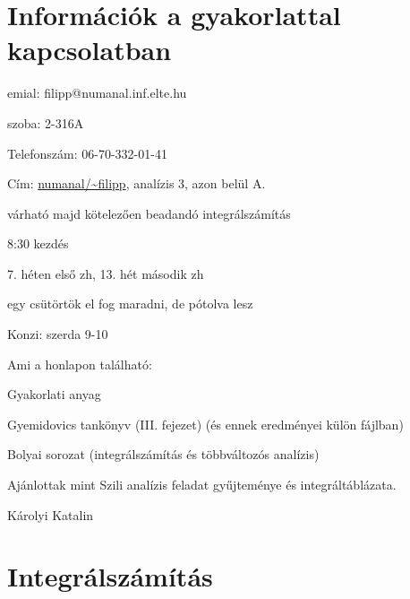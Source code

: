 \documentclass[a4paper,11.5pt]{article}
\begin{document}
	\section{Információk a gyakorlattal kapcsolatban}
	\begin{compactitem}
		\item emial: filipp@numanal.inf.elte.hu
		\item szoba: 2-316A
		\item Telefonszám: 06-70-332-01-41
		\item Cím: \url{numanal/~filipp}, analízis 3, azon belül A.
		\item várható majd kötelezően beadandó integrálszámítás
		\item 8:30 kezdés
		\item 7. héten első zh, 13. hét második zh
		\item egy csütörtök el fog maradni, de pótolva lesz
		\item Konzi: szerda 9-10
	\end{compactitem}
	Ami a honlapon található:
	\begin{compactitem}
		\item Gyakorlati anyag
		\item Gyemidovics tankönyv (III. fejezet) (és ennek eredményei külön fájlban)
		\item Bolyai sorozat (integrálszámítás és többváltozós analízis)
		\item Ajánlottak mint Szili analízis feladat gyűjteménye és integráltáblázata.
		\item Károlyi Katalin
	\end{compactitem}
	\section{Integrálszámítás}
\end{document}
